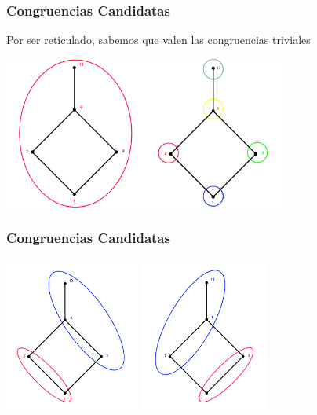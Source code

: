 \documentclass{beamer}
\begin{document}
\begin{frame}
\frametitle{Congruencias Candidatas}
Por ser reticulado, sabemos que valen las congruencias triviales
\begin{center}


\includegraphics[height=5cm]{trivial_1}\includegraphics[height=5cm]{trivial_2}
\end{center}
\end{frame}

\begin{frame}
\frametitle{Congruencias Candidatas}
\begin{center}
\includegraphics[height=5cm]{congruencia_1}
\includegraphics[height=5cm]{congruencia_2}
\end{center}
\end{frame}
\end{document}
